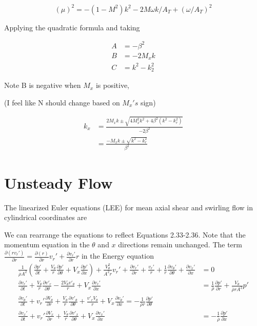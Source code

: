 \documentclass[a4paper]{article}
\begin{document}
\begin{equation}
    (\mu )^2 = -(1 - M^2) k^2 - 2 M \omega k / A_T + \left( \omega/A_T \right)^2
    \label{<+label+>}
\end{equation}



Applying the quadratic formula and taking 

\begin{align*}
    A &= - \beta^2 \\
    B &= - 2M_x k\\
    C &= k^2 - k_2^2
\end{align*} 

Note B is negative when $M_x$ is positive,

(I feel like N should change based on $M_x's$ sign)

\begin{align*}
    k_x &= \frac{2M_x k \pm \sqrt{4 M_x^2 k^2 + 4 \beta^2 \left( k^2 - k_r^2 \right)}}{-2\beta^2}\\
        &= \frac{-M_x k \pm \sqrt{k^2 - k_r^2}}{\beta^2}
\end{align*}
\section{Unsteady Flow}
The linearized Euler equations (LEE) for mean axial shear and swirling flow 
in cylindrical coordinates are 



We can rearrange the equations to reflect Equations 2.33-2.36. Note that the momentum equation in the $\theta$ and $x$ directions remain unchanged. The term $ \frac{\partial(rv_r')}{\partial r}  = \frac{\partial (r)}{\partial r}v_r' + \frac{\partial v_r'}{\partial r} r$ in the Energy equation
\begin{align*}
\frac{1}{\bar{\rho} A^2}\left(
\frac{\partial p'}{\partial t} +
\frac{V_{\theta}}{r}
\frac{\partial p'}{\partial \theta} + 
V_x
\frac{\partial p'}{\partial x}
\right) +
\frac{V_{\theta}^2}{A^2 r}v_r'+
\frac{\partial v_r'}{\partial r} + \frac{v_r'}{r} +
\frac{1}{r}
\frac{\partial v_{\theta}'}{\partial \theta}		 
 +
\frac{\partial v_x'}{\partial x}
&= 0\\
\frac{\partial  v_r' }{\partial t} +
\frac{V_{\theta}}{r} \frac{\partial v'_r}{\partial \theta} -
\frac{2V_{\theta}v'_{\theta}}{r} +
V_x \frac{\partial v_r'}{\partial x} &= \frac{1}{\bar{\rho}} \frac{\partial p'}{\partial r}+\frac{V_{\theta}}{\bar{\rho} r A^2}   p'
\\
\frac{\partial  v_{\theta}' }{\partial t} +
v_r' \frac{\partial  V_{\theta}  }{\partial r} +
\frac{V_{\theta}}{r} \frac{\partial v'_{\theta}}{\partial \theta} +
\frac{v'_rV_{\theta}}{r} +
V_x \frac{\partial v_{\theta}'}{\partial x} 
= -\frac{1}{\bar{\rho} r}	\frac{\partial p'}{\partial \theta}\\
\frac{\partial  v_x' }{\partial t} +
v_r' \frac{\partial  V_x  }{\partial r} +
\frac{V_{\theta}}{r} \frac{\partial v'_x}{\partial \theta} +
V_x \frac{\partial v_x'}{\partial x} 
&= -\frac{1    }{\bar{\rho}}  \frac{\partial p'}{\partial x} 	
\end{align*}
\end{document}
